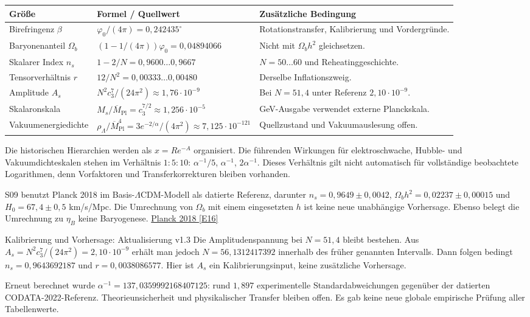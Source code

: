\begin{longtable}{L{36mm}L{49mm}L{65mm}}
\toprule \textbf{Größe}&\textbf{Formel / Quellwert}&\textbf{Zusätzliche Bedingung}\\\midrule\endhead
Birefringenz $\beta$&$\varphi_0/(4\pi)=0{,}242435^\circ$&Rotationstransfer, Kalibrierung und Vordergründe.\\
Baryonenanteil $\Omega_b$&$(1-1/(4\pi))\varphi_0=0{,}04894066$&Nicht mit $\Omega_bh^2$ gleichsetzen.\\
Skalarer Index $n_s$&$1-2/N=0{,}9600\ldots0{,}9667$&$N=50\ldots60$ und Reheatinggeschichte.\\
Tensorverhältnis $r$&$12/N^2=0{,}00333\ldots0{,}00480$&Derselbe Inflationszweig.\\
Amplitude $A_s$&$N^2c_3^7/(24\pi^2)\approx1{,}76\cdot10^{-9}$&Bei $N=51{,}4$ unter Referenz $2{,}10\cdot10^{-9}$.\\
Skalaronskala&$M_s/\overline M_{\mathrm{Pl}}=c_3^{7/2}\approx1{,}256\cdot10^{-5}$&GeV-Ausgabe verwendet externe Planckskala.\\
Vakuumenergiedichte&$\rho_\Lambda/\overline M_{\mathrm{Pl}}^4=3e^{-2/\alpha}/(4\pi^2)\approx7{,}125\cdot10^{-121}$&Quellzustand und Vakuumauslesung offen.\\\bottomrule
\end{longtable}
Die historischen Hierarchien werden als $x=R e^{-A}$ organisiert. Die führenden Wirkungen für elektroschwache, Hubble- und Vakuumdichteskalen stehen im Verhältnis $1:5:10$: $\alpha^{-1}/5$, $\alpha^{-1}$, $2\alpha^{-1}$. Dieses Verhältnis gilt nicht automatisch für vollständige beobachtete Logarithmen, denn Vorfaktoren und Transferkorrekturen bleiben vorhanden.

S09 benutzt Planck 2018 im Basis-$\Lambda$CDM-Modell als datierte Referenz, darunter $n_s=0{,}9649\pm0{,}0042$, $\Omega_bh^2=0{,}02237\pm0{,}00015$ und $H_0=67{,}4\pm0{,}5$ km/s/Mpc. Die Umrechnung von $\Omega_b$ mit einem eingesetzten $h$ ist keine neue unabhängige Vorhersage. Ebenso belegt die Umrechnung zu $\eta_B$ keine Baryogenese. \href{https://arxiv.org/abs/1807.06209}{Planck 2018 [E16]}

\begin{grenze}{Kalibrierung und Vorhersage: Aktualisierung v1.3}
Die Amplitudenspannung bei $N=51{,}4$ bleibt bestehen. Aus $A_s=N^2c_3^7/(24\pi^2)=2{,}10\cdot10^{-9}$ erhält man jedoch $N=56{,}1312417392$ innerhalb des früher genannten Intervalls. Dann folgen bedingt $n_s=0{,}9643692187$ und $r=0{,}0038086577$. Hier ist $A_s$ ein Kalibrierungsinput, keine zusätzliche Vorhersage.

Erneut berechnet wurde $\alpha^{-1}=137{,}0359992168407125$: rund $1{,}897$ experimentelle Standardabweichungen gegenüber der datierten CODATA-2022-Referenz. Theorieunsicherheit und physikalischer Transfer bleiben offen. Es gab keine neue globale empirische Prüfung aller Tabellenwerte.
\end{grenze}
